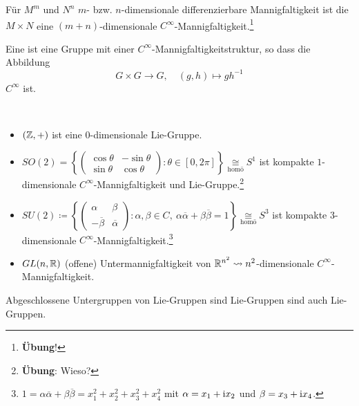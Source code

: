 \begin{example}
  Für $ M^m $ und $ N^n $ $ m $- bzw. $ n $-dimensionale differenzierbare Mannigfaltigkeit ist die \label{def:produktmannigfaltigkeit} $ M \times N $ eine $ (m+n) $-dimensionale $ C^\infty $-Mannigfaltigkeit.\footnote{\textbf{Übung}!}
\end{example}

\begin{excourse}
  Eine \label{def:liegruppe} ist eine Gruppe mit einer $ C^\infty $-Mannigfaltigkeitstruktur, so dass die Abbildung
  \begin{equation*}
    G \times G \to G, \quad (g,h) \mapsto gh^{-1}
  \end{equation*}
  $ C^\infty $ ist.
\end{excourse}

\begin{example}
  \
  \begin{itemize}
    \item $ (\mathbb{Z}, +) $ ist eine $ 0 $-dimensionale Lie-Gruppe.
    \item $ SO(2) = \left\{ \begin{pmatrix}
      \cos \theta & -\sin \theta \\
      \sin \theta & \cos \theta
    \end{pmatrix} : \theta \in [0, 2\pi] \right\} \underset{\text{homö}}{\cong} S^1 $ ist kompakte $ 1 $-dimensionale $ C^\infty $-Mannigfaltigkeit und Lie-Gruppe.\footnote{\textbf{Übung}: Wieso?} 
    \item $ SU(2) \coloneqq \left\{ \begin{pmatrix}
      \alpha & \beta \\
      -\overline{\beta} & \overline{\alpha}
    \end{pmatrix} : \alpha, \beta \in C, \ \alpha\overline{\alpha}+\beta\overline{\beta} = 1 \right\} \underset{\text{homö}}{\cong} S^3 $ ist kompakte $ 3 $-dimensionale $ C^\infty $-Mannigfaltigkeit.\footnote{$ 1 = \alpha\overline{\alpha}+\beta\overline{\beta} = x_1^2 + x_2^2 + x_3^2 + x_4^2 $ mit $ \alpha = x_1+\text{\rmfamily i} x_2 $ und $ \beta = x_3 + \text{\rmfamily i} x_4 $.}
    \item $ GL(n, \mathbb{R}) $ (offene) Untermannigfaltigkeit von $ \mathbb{R}^{n^2} \leadsto n^2 $-dimensionale $ C^\infty $-Mannigfaltigkeit.
  \end{itemize}
\end{example}

\begin{remark}
  Abgeschlossene Untergruppen von Lie-Gruppen sind Lie-Gruppen sind auch Lie-Gruppen.
\end{remark}

